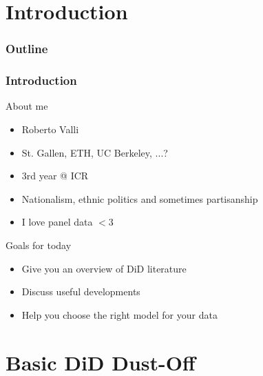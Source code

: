 \documentclass[12pt,aspectratio=169]{beamer}\usepackage[]{graphicx}\usepackage[]{xcolor}
\begin{document}

\section{Introduction}




\begin{frame}
\frametitle{Outline}

    \tableofcontents
    
\end{frame}


\begin{frame}
\frametitle{Introduction}

    \begin{alertblock}{About me}
    \small
    
    \begin{itemize}[itemsep=0em, topsep=0pt]
        \item Roberto Valli
        \item St. Gallen, ETH, UC Berkeley, ...?
        \item 3rd year @ ICR
        \item Nationalism, ethnic politics and sometimes partisanship
        \item I love panel data $<3$
    \end{itemize}

    \end{alertblock}

    \begin{alertblock}{Goals for today}
    \small

    \begin{itemize}[itemsep=0em, topsep=0pt]
        \item Give you an overview of DiD literature
        \item Discuss useful developments
        \item Help you choose the right model for your data
    \end{itemize}

    \end{alertblock}
%     
\end{frame}


\section{Basic DiD Dust-Off}
\end{document}
